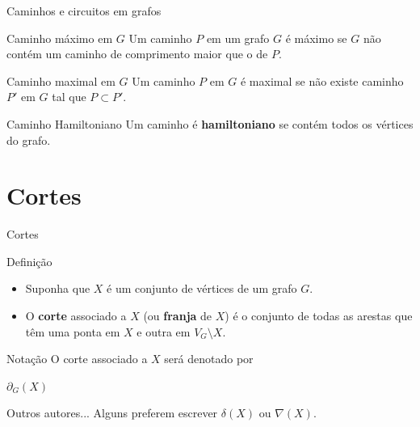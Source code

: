 \documentclass[xcolor=dvipsnames,table]{beamer}
\begin{document}
	\begin{frame}{Caminhos e circuitos em grafos}
		\begin{block}{Caminho máximo em $G$}
			Um caminho $P$ em um grafo $G$ é máximo se $G$ não contém um caminho de comprimento maior que o de $P$.
		\end{block} \pause
		\begin{block}{Caminho maximal em $G$}
			Um caminho $P$ em $G$ é maximal se não existe caminho $P'$ em $G$ tal que $P \subset P'$.
		\end{block} \pause
		\begin{block}{Caminho Hamiltoniano}
			Um caminho é {\bf hamiltoniano} se contém todos os vértices do grafo.
		\end{block}
	\end{frame}	
	
	\section{Cortes}
	\begin{frame}{Cortes}
		\begin{block}{Definição}
			\begin{itemize}
				\item Suponha que $X$ é um conjunto de vértices de um grafo $G$. \pause
				\item O {\bf corte} associado a $X$ (ou {\bf franja} de $X$) é o conjunto de todas as arestas que têm uma ponta em $X$ e outra em $V_G \setminus X$.
			\end{itemize}
		\end{block} \pause
		\begin{block}{Notação}
			O corte associado a $X$ será denotado por
			\begin{center}
				$\partial_G (X)$
			\end{center}
		\end{block} \pause
		\begin{alertblock}{Outros autores...}
			Alguns preferem escrever $\delta(X)$ ou $\nabla(X)$.
		\end{alertblock}
	\end{frame}
	
\end{document}
